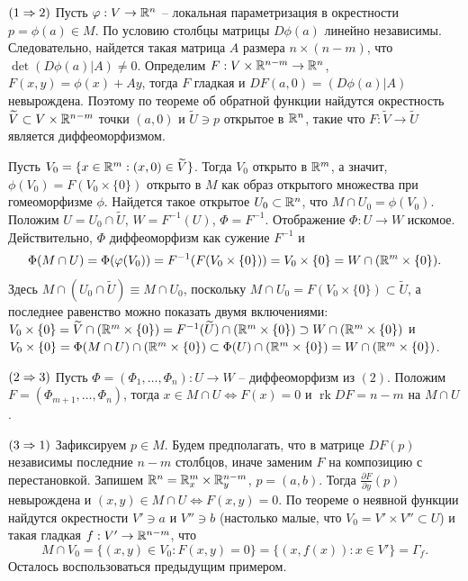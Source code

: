 \begin{myproof}
	$(1 \Rightarrow 2)$ Пусть $\varphi : V \to \mathbb{R}^n$ -- локальная параметризация в окрестности $p = \phi(a) \in M$.
	По условию столбцы матрицы $D\phi(a)$ линейно независимы. %
	Следовательно, найдется такая матрица $A$ размера $n \times (n-m)$, что $\det (D\phi(a) | A) \neq 0$.
	Определим $F : V \times \mathbb{R}^{n-m} \to \mathbb{R}^n$, $F(x, y) = \phi(x) + Ay$, тогда $F$ гладкая и $DF(a, 0) = (D\phi(a)|A)$ невырождена. 
	Поэтому по теореме об обратной функции найдутся окрестность $\widetilde{V} \subset V \times \mathbb{R}^{n-m}$ точки $(a, 0)$ и $\widetilde{U} \ni p$ открытое в $\mathbb{R}^n$, такие что $F : \widetilde{V} \to \widetilde{U}$ является диффеоморфизмом.

	\vspace{5pt}
	Пусть $V_0 = \{x \in \mathbb{R}^m : (x, 0) \in \widetilde{V}\}$. Тогда $V_0$ открыто в $\mathbb{R}^m$, а значит, $\phi(V_0) = F(V_0 \times \{0\})$ открыто в $M$ как образ открытого множества при гомеоморфизме $\phi$.
	Найдется такое открытое $U_0 \subset \mathbb{R}^n$, что $M \cap U_0 = \phi(V_0)$.
	Положим $U = U_0 \cap \widetilde{U}$, $W = F^{-1}(U)$, $\Phi = F^{-1}$.
	Отображение $\Phi : U \to W$ искомое. 
	Действительно, $\Phi$ диффеоморфизм как сужение $F^{-1}$ и 
	\[ \Phi(M \cap U) = \Phi(\varphi(V_0)) = F^{-1}(F(V_0 \times \{0\})) = V_0 \times \{0\} = W \cap (\mathbb{R}^m \times \{0\}). \]
	Здесь $M \cap (U_0 \cap \widetilde{U}) \equiv M \cap U_0$, поскольку $M \cap U_0 = F(V_0 \times \{0\}) \subset \widetilde{U}$, 
	а последнее равенство можно показать двумя включениями: $V_0 \times \{0\} = \widetilde{V} \cap (\mathbb{R}^m \times \{0\}) = F^{-1}(\widetilde{U}) \cap (\mathbb{R}^m \times \{0\}) \supset W \cap (\mathbb{R}^m \times \{0\})$ и $V_0 \times \{0\} = \Phi(M \cap U) \cap (\mathbb{R}^m \times \{0\}) \subset \Phi(U) \cap (\mathbb{R}^m \times \{0\}) = W \cap (\mathbb{R}^m \times \{0\})$.

	\vspace{5pt}
	$(2 \Rightarrow 3)$ Пусть $\Phi = (\Phi_1, \dotsc, \Phi_n) : U \to W$ -- диффеоморфизм из $(2)$. 
	Положим $F = (\Phi_{m+1}, \dotsc, \Phi_n)$, тогда $x \in M \cap U \iff F(x) = 0$ и $\operatorname{rk} DF = n-m$ на $M \cap U$.

	\vspace{5pt}
	$(3 \Rightarrow 1)$ Зафиксируем $p \in M$. Будем предполагать, что в матрице $DF(p)$ независимы последние $n-m$ столбцов, иначе заменим $F$ на композицию с перестановкой. 
	Запишем $\mathbb{R}^n = \mathbb{R}^m_x \times \mathbb{R}^{n-m}_y$, $p = (a, b)$. 
	Тогда $\frac{\partial F}{\partial y}(p)$ невырождена и $(x, y) \in M \cap U \iff F(x, y) = 0$. 
	По теореме о неявной функции найдутся окрестности $V' \ni a$ и $V'' \ni b$ (настолько малые, что $V_0 = V' \times V'' \subset U$) 
	и такая гладкая $f: V' \to \mathbb{R}^{n-m}$, что 
	\[ M \cap V_0 = \{(x, y) \in V_0 : F(x, y) = 0\} = \{(x, f(x)) : x \in V'\} = \Gamma_f. \]
	Осталось воспользоваться предыдущим примером.
\end{myproof}

